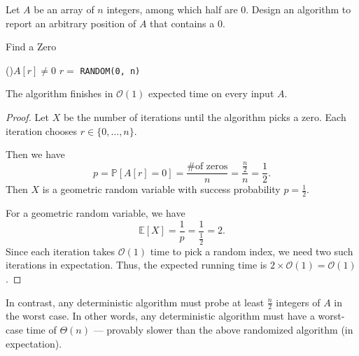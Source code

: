 \begin{eg}
  Let \(A\) be an array of \(n\) integers, among which half are 0. Design an algorithm to report an arbitrary position of \(A\) that contains a 0. 

  \begin{algorithm}[H]
	\DontPrintSemicolon{}
	\caption{Find a Zero}
	\BlankLine
	\While(){\(A[r] \neq 0\)}{
		\(r = \) \texttt{RANDOM(0, n)}
	}
	\;
  \end{algorithm}

  The algorithm finishes in \(\mathcal{O}(1)\) expected time on every input \(A\). 

  \begin{proof}
    Let \(X\) be the number of iterations until the algorithm picks a zero. Each iteration chooses \(r \in \{0,\dots, n\}\). 

    Then we have 
    \[
      p = \mathbb{P}\left[A[r] = 0\right] = \dfrac{\text{\# of zeros}}{n} = \dfrac{\frac{n}{2}}{n} = \dfrac{1}{2}.
    \]
    Then \(X\) is a geometric random variable with success probability \(p = \frac{1}{2}\). 

    For a geometric random variable, we have
    \[
      \mathbb{E}[X] = \dfrac{1}{p} = \dfrac{1}{\frac{1}{2}} = 2.
    \]
    Since each iteration takes \(\mathcal{O}(1)\) time to pick a random index, we need two such iterations in expectation. Thus, the expected running time is \(2 \times \mathcal{O}(1) = \mathcal{O}(1)\). 
  \end{proof}

  \begin{remark}
    In contrast, any deterministic algorithm must probe at least \(\frac{n}{2}\) integers of \(A\) in the worst case. In other words, any deterministic algorithm must have a worst-case time of \(\Theta(n)\) — provably slower than the above randomized algorithm (in expectation).
  \end{remark}
\end{eg}
